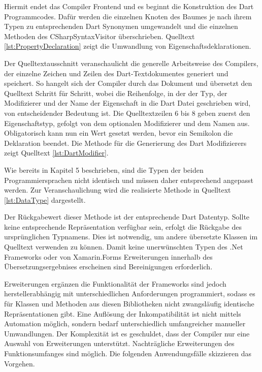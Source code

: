 Hiermit endet das Compiler Frontend und es beginnt die Konstruktion des Dart Programmcodes.  Dafür werden die einzelnen Knoten des Baumes je nach ihrem Typen zu entsprechenden Dart Synonymen umgewandelt und die einzelnen Methoden des \glq CSharpSyntaxVisitor\grq{} überschrieben.  Quelltext \ref{lst:PropertyDeclaration} zeigt die Umwandlung von Eigenschaftsdeklarationen.
\newpage


Der Quelltextausschnitt veranschaulicht die generelle Arbeitsweise des Compilers,  der einzelne Zeichen und Zeilen des Dart-Textdokumentes generiert und speichert.  So hangelt sich der Compiler durch das Dokument und übersetzt den Quelltext Schritt für Schritt, wobei die Reihenfolge, in der der Typ, der Modifizierer und der Name der Eigenschaft in die Dart Datei geschrieben wird,  von entscheidender Bedeutung ist.  Die Quelltextzeilen 6 bis 8 geben zuerst den Eigenschaftstyp,  gefolgt von dem optionalen Modifizierer und dem Namen aus.  Obligatorisch kann nun ein Wert gesetzt werden,  bevor ein Semikolon die Deklaration beendet.  Die Methode für die Generierung des Dart Modifizierers zeigt Quelltext \ref{lst:DartModifier}.




Wie bereits in Kapitel 5 beschrieben,  sind die Typen der beiden Programmiersprachen nicht identisch und müssen daher entsprechend angepasst werden.  Zur Veranschaulichung wird die realisierte Methode in Quelltext \ref{lst:DataType} dargestellt. 


Der Rückgabewert dieser Methode ist der entsprechende Dart Datentyp.  Sollte keine entsprechende Repräsentation verfügbar sein,  erfolgt die Rückgabe des ursprünglichen Typnamens.  Dies ist notwendig,  um andere übersetzte Klassen im Quelltext verwenden zu können.  Damit keine unerwünschten Typen des .Net Frameworks oder von Xamarin.Forms Erweiterungen innerhalb des Übersetzungsergebnises erscheinen sind Bereinigungen erforderlich. 

Erweiterungen ergänzen die Funktionalität der Frameworks sind jedoch herstellerabhängig mit unterschiedlichen Anforderungen programmiert,  sodass es für Klassen und Methoden aus diesen Bibliotheken nicht zwangsläufig identische Repräsentationen gibt.  Eine Auflösung der Inkompatibilität ist nicht mittels Automation möglich, sondern bedarf unterschiedlich umfangreicher manueller Umwandlungen.  Der Komplexität ist es geschuldet,  dass der Compiler nur eine Auswahl von Erweiterungen unterstützt.  Nachträgliche Erweiterungen des Funktionsumfanges sind möglich.  Die folgenden Anwendungsfälle skizzieren das Vorgehen.  

